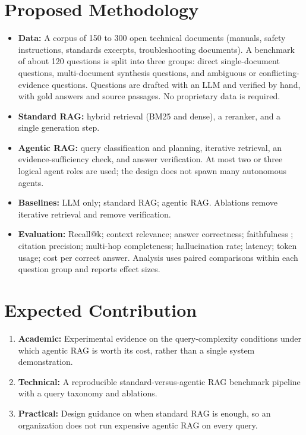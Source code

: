 \documentclass[10pt,a4paper]{article}
\begin{document}
\section{Proposed Methodology}

\begin{itemize}
    \item \textbf{Data:} A corpus of 150 to 300 open technical documents (manuals, safety instructions, standards excerpts, troubleshooting documents). A benchmark of about 120 questions is split into three groups: direct single-document questions, multi-document synthesis questions, and ambiguous or conflicting-evidence questions. Questions are drafted with an LLM and verified by hand, with gold answers and source passages. No proprietary data is required.
    \item \textbf{Standard RAG:} hybrid retrieval (BM25 and dense), a reranker, and a single generation step.
    \item \textbf{Agentic RAG:} query classification and planning, iterative retrieval, an evidence-sufficiency check, and answer verification. At most two or three logical agent roles are used; the design does not spawn many autonomous agents.
    \item \textbf{Baselines:} LLM only; standard RAG; agentic RAG. Ablations remove iterative retrieval and remove verification.
    \item \textbf{Evaluation:} Recall@k; context relevance; answer correctness; faithfulness \cite{es2024ragas}; citation precision; multi-hop completeness; hallucination rate; latency; token usage; cost per correct answer. Analysis uses paired comparisons within each question group and reports effect sizes.
\end{itemize}

\section{Expected Contribution}

\begin{enumerate}
    \item \textbf{Academic:} Experimental evidence on the query-complexity conditions under which agentic RAG is worth its cost, rather than a single system demonstration.
    \item \textbf{Technical:} A reproducible standard-versus-agentic RAG benchmark pipeline with a query taxonomy and ablations.
    \item \textbf{Practical:} Design guidance on when standard RAG is enough, so an organization does not run expensive agentic RAG on every query.
\end{enumerate}
\end{document}
